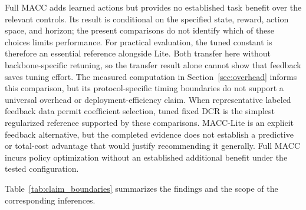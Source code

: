 \documentclass[10pt,a4paper,twocolumn]{article}
\begin{document}
Full MACC adds learned actions but provides no established task benefit
over the relevant controls. Its result is conditional on the specified
state, reward, action space, and horizon; the present comparisons do
not identify which of these choices limits performance. For practical
evaluation, the tuned constant is therefore an essential reference
alongside Lite. Both transfer here without backbone-specific retuning,
so the transfer result alone cannot show that feedback saves tuning
effort. The measured computation in Section~\ref{sec:overhead} informs
this comparison, but its protocol-specific timing boundaries do not
support a universal overhead or deployment-efficiency claim. When
representative labeled feedback data permit coefficient selection, tuned
fixed DCR is the simplest regularized reference supported by these
comparisons. MACC-Lite is an explicit feedback alternative, but the
completed evidence does not establish a predictive or total-cost advantage
that would justify recommending it generally. Full MACC incurs policy
optimization without an established additional benefit under the tested
configuration.

Table~\ref{tab:claim_boundaries} summarizes the findings and the
scope of the corresponding inferences.
\end{document}
